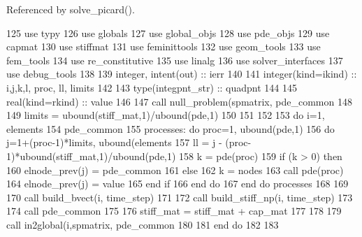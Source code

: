 Referenced by solve\+\_\+picard().


\begin{DoxyCode}
125       \textcolor{keywordtype}{use }typy
126       \textcolor{keywordtype}{use }globals
127       \textcolor{keywordtype}{use }global_objs
128       \textcolor{keywordtype}{use }pde_objs
129       \textcolor{keywordtype}{use }capmat
130       \textcolor{keywordtype}{use }stiffmat
131       \textcolor{keywordtype}{use }feminittools
132       \textcolor{keywordtype}{use }geom_tools
133       \textcolor{keywordtype}{use }fem_tools
134       \textcolor{keywordtype}{use }re_constitutive
135       \textcolor{keywordtype}{use }linalg
136       \textcolor{keywordtype}{use }solver_interfaces
137       \textcolor{keywordtype}{use }debug_tools
138 
139       \textcolor{keywordtype}{integer}, \textcolor{keywordtype}{intent(out)} :: ierr
140 
141       \textcolor{keywordtype}{integer(kind=ikind)} :: i,j,k,l, proc, ll, limits
142             
143       \textcolor{keywordtype}{type}(integpnt_str) :: quadpnt
144       
145       \textcolor{keywordtype}{real(kind=rkind)} :: value
146 
147       \textcolor{keyword}{call }null_problem(spmatrix, pde_common%
148       
149       limits = ubound(stiff_mat,1)/ubound(pde,1)
150 
151 
152 
153       \textcolor{keywordflow}{do} i=1, elements%
154         pde_common%
155         processes: \textcolor{keywordflow}{do} proc=1, ubound(pde,1)
156                     \textcolor{keywordflow}{do} j=1+(proc-1)*limits, ubound(elements%
157                       ll = j - (proc-1)*ubound(stiff_mat,1)/ubound(pde,1)
158                       k = pde(proc)%
159                       \textcolor{keywordflow}{if} (k > 0) \textcolor{keywordflow}{then}
160                         elnode_prev(j) = pde_common%
161                       \textcolor{keywordflow}{else}
162                         k = nodes%
163                         \textcolor{keyword}{call }pde(proc)%
164                         elnode_prev(j) = \textcolor{keywordtype}{value}
165 \textcolor{keywordflow}{                      end if}
166 \textcolor{keywordflow}{                    end do}
167 \textcolor{keywordflow}{        end do} processes
168         
169 
170         \textcolor{keyword}{call }build_bvect(i, time_step)
171         
172         \textcolor{keyword}{call }build_stiff_np(i, time_step)
173         
174         \textcolor{keyword}{call }pde_common%
175                 
176         stiff_mat = stiff_mat + cap_mat
177 
178         
179         \textcolor{keyword}{call }in2global(i,spmatrix, pde_common%
180 
181 \textcolor{keywordflow}{      end do}
182 
183 
\end{DoxyCode}


